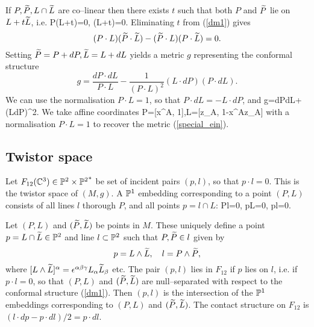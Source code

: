 If $P,\widetilde{P},L\cap\widetilde{L}$ are co--linear then there exists $t$ such that both $P$ and $\widetilde{P}$ lie on $L+t\widetilde{L}$, i.e.
\be
\label{dm1}
P\cdot (L+t\tL)=0,  \quad
\tP\cdot (L+t\tL)=0.
\ee 
Eliminating $t$ from 
(\ref{dm1}) gives
\[
(P\cdot L)(\widetilde{P}\cdot \widetilde{L})-(\widetilde{P}\cdot L)(P\cdot \widetilde{L})=0.
\]
Setting $\widetilde{P}=P+dP, \widetilde{L}=L+dL$ yields a metric 
$g$  representing the conformal structure
\[
g=\frac{dP\cdot dL}{P\cdot L}-\frac{1}{(P\cdot L)^2}(L\cdot dP)(P\cdot dL).
\]
We can use the normalisation $P\cdot L=1$, so that $P\cdot dL=-L\cdot dP$,
and
\be
\label{dm_metric}
g={dP\cdot dL}+(L\cdot dP)^2.
\ee
We take affine coordinates 
\be
\label{DM_parameter}
P=[x^A, 1],\quad L=[z_A, 1-x^Az_A]
\ee 
with a normalisation $P\cdot L=1$ to recover the metric (\ref{special_ein}).
\koniec
\subsection{Twistor space}
\label{twist_SSS}
Let $F_{12}(\mathbb{C}^3)\in \mathbb{P}^2\times {\mathbb{P}^2}^*$ be set of incident pairs 
$(p, l)$, so that $p\cdot l=0$. This is the twistor space of $(M, g)$.
A $\mathbb{P}^1$ embedding corresponding to a point $(P, L)$
consists of all lines $l$ thorough $P$, and all points
$p=l\cap L$:
\be
\label{dm2}
P\cdot l=0, \quad p\cdot L=0, \quad p\cdot l=0.
\ee

Let $(P, L)$ and $(\widetilde{P}, \widetilde{L})$ be points in $M$. These uniquely define a point $p=L\cap\widetilde{L}\in\mathbb{P}^2$ and line $l\subset\mathbb{P}^2$ such that $P,\widetilde{P}\in l$ given by
\[
p=L\wedge \widetilde{L}, \quad l=P\wedge \widetilde{P},
\]
where $[L\wedge\widetilde{L}]^{\alpha}=\epsilon^{\alpha\beta\gamma}L_{\alpha}\widetilde{L}_{\beta}$ etc.
The pair $(p,l)$ lies in $F_{12}$ if $p$ lies on $l$, i.e. if $p\cdot l=0$, so that $(P, L)$ and $(\widetilde{P}, \widetilde{L})$ are null--separated with respect to the conformal structure
(\ref{dm1}). Then $(p,l)$ is the intersection of the $\mathbb{P}^1$ embeddings corresponding to $(P, L)$ and $(\widetilde{P}, \widetilde{L})$. The contact structure on $F_{12}$ is $(l\cdot dp-p\cdot dl)/2=p\cdot dl$. 

